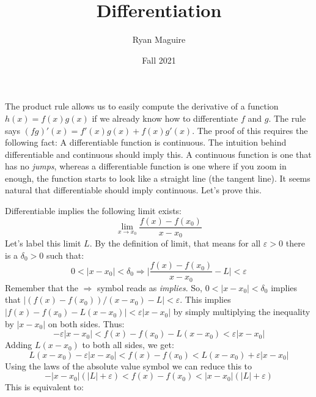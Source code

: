 \documentclass{article}
\title{Differentiation}
\author{Ryan Maguire}
\date{Fall 2021}
\theoremstyle{normal}
\theoremstyle{plain}
\begin{document}
    \maketitle
    The product rule allows us to easily compute the derivative of a function
    $h(x)=f(x)g(x)$ if we already know how to differentiate $f$ and $g$.
    The rule says $(fg)'(x)=f'(x)g(x)+f(x)g'(x)$. The proof of this requires
    the following fact: A differentiable function is continuous. The intuition
    behind differentiable and continuous should imply this. A continuous
    function is one that has no \textit{jumps}, whereas a differentiable
    function is one where if you zoom in enough, the function starts to
    look like a straight line (the tangent line). It seems natural that
    differentiable should imply continuous. Let's prove this.
    \par\hfill\par
    Differentiable implies the following limit exists:
    \begin{equation}
        \lim_{x\rightarrow{x}_{0}}\frac{f(x)-f(x_{0})}{x-x_{0}}
    \end{equation}
    Let's label this limit $L$. By the definition of limit, that means for
    all $\varepsilon>0$ there is a $\delta_{0}>0$ such that:
    \begin{equation}
        0<|x-x_{0}|<\delta_{0}\Rightarrow
        \Big|\frac{f(x)-f(x_{0})}{x-x_{0}}-L\Big|<\varepsilon
    \end{equation}
    Remember that the $\Rightarrow$ symbol reads as \textit{implies}. So,
    $0<|x-x_{0}|<\delta_{0}$ implies that
    $|(f(x)-f(x_{0}))/(x-x_{0})-L|<\varepsilon$. This implies
    $|f(x)-f(x_{0})-L(x-x_{0})|<\varepsilon|x-x_{0}|$ by simply
    multiplying the inequality by $|x-x_{0}|$ on both sides. Thus:
    \begin{equation}
        -\varepsilon|x-x_{0}|<f(x)-f(x_{0})-L(x-x_{0})<\varepsilon|x-x_{0}|
    \end{equation}
    Adding $L(x-x_{0})$ to both all sides, we get:
    \begin{equation}
        L(x-x_{0})-\varepsilon|x-x_{0}|<f(x)-f(x_{0})
            <L(x-x_{0})+\varepsilon|x-x_{0}|
    \end{equation}
    Using the laws of the absolute value symbol we can reduce this to
    \begin{equation}
        -|x-x_{0}|(|L|+\varepsilon)<f(x)-f(x_{0})<|x-x_{0}|(|L|+\varepsilon)
    \end{equation}
    This is equivalent to:
\end{document}
